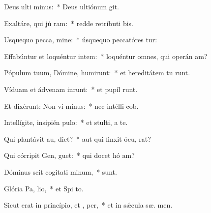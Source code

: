 \item Deus ulti minus:~* Deus ultiónum  git.
\item Exaltáre, qui jú ram:~* redde retributi bis.
\item Usquequo pecca, mine:~* úsquequo peccatóres tur:
\item Effabúntur et loquéntur intem:~* loquéntur omnes, qui operán am?
\item Pópulum tuum, Dómine, humirunt:~* et hereditátem tu runt.
\item Víduam et ádvenam inrunt:~* et pupíl runt.
\item Et dixérunt: Non vi minus:~* nec intélli  cob.
\item Intellígite, insipién  pulo:~* et stulti, a te.
\item Qui plantávit au,  diet?~* aut qui finxit ócu,  rat?
\item Qui córripit Gen,  guet:~* qui docet hó am?
\item Dóminus scit cogitati minum,~*   sunt.
\item Glória Pa,  lio,~* et Spi to.
\item Sicut erat in princípio, et ,  per,~* et in sǽcula sæ. men.

